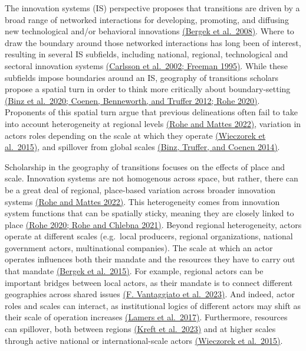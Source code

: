 \documentclass[twoside,12pt,final]{ucthesis-CA2012}
\begin{document}
\begin{ucmainmatter}
The innovation systems (IS) perspective proposes that transitions are
driven by a broad range of networked interactions for developing,
promoting, and diffusing new technological and/or behavioral innovations
\href{https://www.zotero.org/google-docs/?jBC7fR}{(Bergek et al.~2008)}.
Where to draw the boundary around those networked interactions has long
been of interest, resulting in several IS subfields, including national,
regional, technological and sectoral innovation systems \href{https://www.zotero.org/google-docs/?bpgSbT}{(Carlsson et
al.~2002; Freeman 1995)}.
While these subfields impose boundaries around an IS, geography of
transitions scholars propose a spatial turn in order to think more
critically about boundary-setting \href{https://www.zotero.org/google-docs/?nYllwo}{(Binz et al.~2020; Coenen,
Benneworth, and Truffer 2012; Rohe
2020)}. Proponents of this
spatial turn argue that previous delineations often fail to take into
account heterogeneity at regional levels \href{https://www.zotero.org/google-docs/?O5cmuv}{(Rohe and Mattes
2022)}, variation in
actors\textquotesingle{} roles depending on the scale at which they operate \href{https://www.zotero.org/google-docs/?zKyBo4}{(Wieczorek
et al.~2015)}, and spillover
from global scales \href{https://www.zotero.org/google-docs/?723iWv}{(Binz, Truffer, and Coenen
2014)}.

Scholarship in the geography of transitions focuses on the effects of
place and scale. Innovation systems are not homogenous across space, but
rather, there can be a great deal of regional, place-based variation
across broader innovation systems \href{https://www.zotero.org/google-docs/?wClimp}{(Rohe and Mattes
2022)}. This heterogeneity
comes from innovation system functions that can be spatially \textquotesingle sticky\textquotesingle,
meaning they are closely linked to place \href{https://www.zotero.org/google-docs/?cG6njg}{(Rohe 2020; Rohe and Chlebna
2021)}. Beyond regional
heterogeneity, actors operate at different scales (e.g.~local producers,
regional organizations, national government actors, multinational
companies). The scale at which an actor operates influences both their
mandate and the resources they have to carry out that mandate \href{https://www.zotero.org/google-docs/?sYggSX}{(Bergek
et al.~2015)}. For example,
regional actors can be important bridges between local actors, as their
mandate is to connect different geographies across shared issues \href{https://www.zotero.org/google-docs/?cNsLIW}{(F.
Vantaggiato et al.~2023)}.
And indeed, actor roles and scales can interact, as institutional logics
of different actors may shift as their scale of operation increases
\href{https://www.zotero.org/google-docs/?9a6i62}{(Lamers et al.~2017)}.
Furthermore, resources can spillover, both between regions \href{https://www.zotero.org/google-docs/?vwIeIe}{(Kreft et
al.~2023)} and at higher
scales through active national or international-scale actors \href{https://www.zotero.org/google-docs/?pXgqFy}{(Wieczorek
et al.~2015)}.


\end{ucmainmatter}
\end{document}
